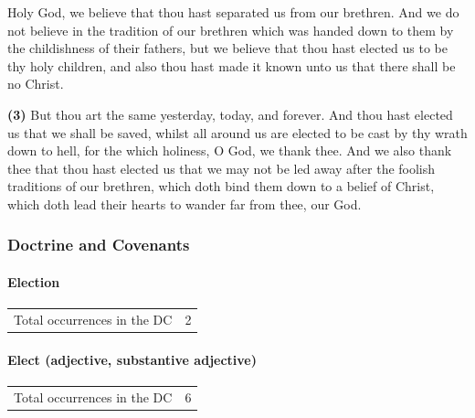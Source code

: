 			\begin{compactdesc}
				\item[{\hyperref[ALMA-31-16]{Alma 31:16}}] Holy God, we believe that thou hast separated us from our brethren. And we do not believe in the tradition of our brethren which was handed down to them by the childishness of their fathers, but we believe that thou hast elected us to be thy holy children, and also thou hast made it known unto us that there shall be no Christ.
				\item[{\hyperref[ALMA-31-17]{Alma 31:17}}] \textbf{(3)} But thou art the same yesterday, today, and forever. And thou hast elected us that we shall be saved, whilst all around us are elected to be cast by thy wrath down to hell, for the which holiness, O God, we thank thee. And we also thank thee that thou hast elected us that we may not be led away after the foolish traditions of our brethren, which doth bind them down to a belief of Christ, which doth lead their hearts to wander far from thee, our God. 
			\end{compactdesc}
		
	\subsubsection{Doctrine and Covenants} %
		\label{ELECTION-DC}
		
		\paragraph{Election}
	
			\begin{tabular}{ll}
				Total occurrences in the DC & 2
			\end{tabular}
			
			\begin{compactdesc}
				\item[{\hyperref[DC53-1]{DC 53:1}}]
				\item[{\hyperref[DC84-99]{DC 84:99}}]
			\end{compactdesc}
		
		\paragraph{Elect (adjective, substantive adjective)}
	
			\begin{tabular}{ll}
				Total occurrences in the DC & 6
			\end{tabular}
			
